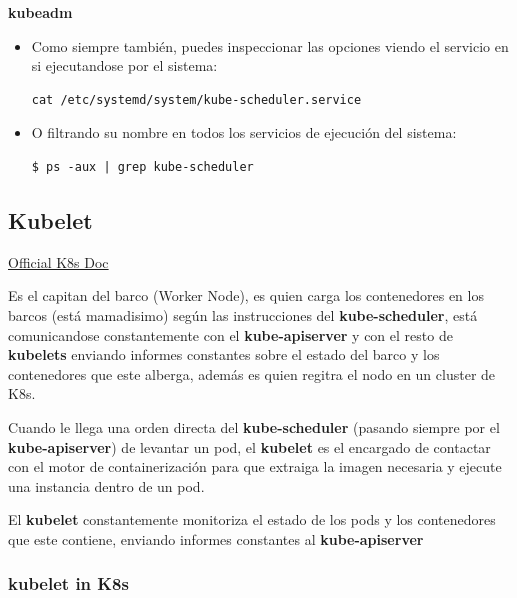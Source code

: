 \documentclass{article}
\newenvironment{codetemplate}[1][]{%
  \mybasecolorbox[#1]
  \itshape
}{%
  \endmybasecolorbox
}
\begin{document}
\textbf{kubeadm}

\begin{itemize}
    \item Como siempre también, puedes inspeccionar las opciones viendo el servicio en si ejecutandose por el sistema:
\begin{codetemplate}{}
\begin{verbatim}
cat /etc/systemd/system/kube-scheduler.service
\end{verbatim}
\end{codetemplate}

    \item O filtrando su nombre en todos los servicios de ejecución del sistema:
\begin{codetemplate}{}
\begin{verbatim}
$ ps -aux | grep kube-scheduler
\end{verbatim}
\end{codetemplate}
\end{itemize}

\subsection{Kubelet}

\href{https://kubernetes.io/docs/reference/command-line-tools-reference/kubelet/}{Official K8s Doc}

Es el capitan del barco (Worker Node), es quien carga los contenedores en los barcos (está mamadisimo) según las instrucciones del \textbf{kube-scheduler}, está comunicandose constantemente con el \textbf{kube-apiserver} y con el resto de \textbf{kubelets} enviando informes constantes sobre el estado del barco y los contenedores que este alberga, además es quien regitra el nodo en un cluster de K8s.

Cuando le llega una orden directa del \textbf{kube-scheduler} (pasando siempre por el \textbf{kube-apiserver}) de levantar un pod, el \textbf{kubelet} es el encargado de contactar con el motor de containerización para que extraiga la imagen necesaria y ejecute una instancia dentro de un pod.

El \textbf{kubelet} constantemente monitoriza el estado de los pods y los contenedores que este contiene, enviando informes constantes al \textbf{kube-apiserver}

\subsubsection{kubelet in K8s}
\end{document}
